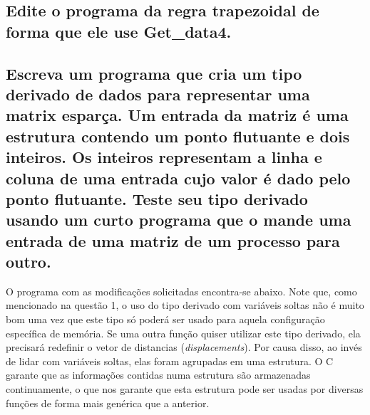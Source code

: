 \documentclass[11pt,a4paper,onecolumn]{article}
\begin{document}
\subsection{Edite o programa da regra trapezoidal de forma que ele use Get\_data4.}
%

\subsection{Escreva um programa que cria um tipo derivado de dados para representar uma matrix esparça. Um entrada da matriz é uma estrutura contendo um ponto flutuante e dois inteiros. Os inteiros representam a linha e coluna de uma entrada cujo valor é dado pelo ponto flutuante. Teste seu tipo derivado usando um curto programa que o mande uma entrada de uma matriz de um processo para outro.}
O programa com as modificações solicitadas encontra-se abaixo.
Note que, como mencionado na questão 1, o uso do tipo derivado com variáveis soltas não é muito bom uma vez que este tipo só poderá ser usado para aquela configuração específica de memória.
Se uma outra função quiser utilizar este tipo derivado, ela precisará redefinir o vetor de distancias (\textit{displacements}).
Por causa disso, ao invés de lidar com variáveis soltas, elas foram agrupadas em uma estrutura.
O C garante que as informações contidas numa estrutura são armazenadas continuamente, o que nos garante que esta estrutura pode ser usadas por diversas funções de forma mais genérica que a anterior. 

\end{document}
